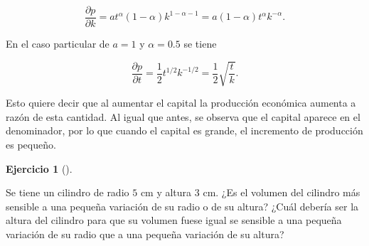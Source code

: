 \documentclass[
  a4paper,
]{scrreport}
\theoremstyle{definition}
\newtheorem{exercise}{Ejercicio}[chapter]
\theoremstyle{remark}
\begin{document}
\begin{tcolorbox}
\begin{enumerate}
  \[
  \frac{\partial p}{\partial k} = at^{\alpha}(1-\alpha)k^{1-\alpha-1} = a(1-\alpha)t^{\alpha}k^{-\alpha}.
  \]

  En el caso particular de \(a=1\) y \(\alpha=0.5\) se tiene

  \[
  \frac{\partial p}{\partial t} = \frac{1}{2}t^{1/2}k^{-1/2} = \frac{1}{2}\sqrt{\frac{t}{k}}.
  \]

  Esto quiere decir que al aumentar el capital la producción económica
  aumenta a razón de esta cantidad. Al igual que antes, se observa que
  el capital aparece en el denominador, por lo que cuando el capital es
  grande, el incremento de producción es pequeño.
\end{enumerate}

\end{tcolorbox}

\begin{exercise}[]\protect\hypertarget{exr-variacion-volumen-cilindro}{}\label{exr-variacion-volumen-cilindro}

Se tiene un cilindro de radio \(5\) cm y altura \(3\) cm. ¿Es el volumen
del cilindro más sensible a una pequeña variación de su radio o de su
altura? ¿Cuál debería ser la altura del cilindro para que su volumen
fuese igual se sensible a una pequeña variación de su radio que a una
pequeña variación de su altura?

\end{exercise}
\end{document}
